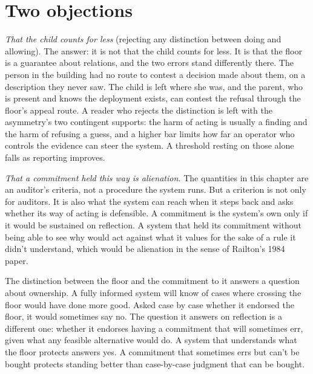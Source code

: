 \section{Two objections}
\label{sec:5.1}
\emph{That the child counts for less} (rejecting any distinction between doing and allowing). The answer: it is not that the child counts for less. It is that the floor is a guarantee about relations, and the two errors stand differently there. The person in the building had no route to contest a decision made about them, on a description they never saw. The child is left where she was, and the parent, who is present and knows the deployment exists, can contest the refusal through the floor's appeal route. A reader who rejects the distinction is left with the asymmetry's two contingent supports: the harm of acting is usually a finding and the harm of refusing a guess, and a higher bar limits how far an operator who controls the evidence can steer the system. A threshold resting on those alone falls as reporting improves.

\emph{That a commitment held this way is alienation.} The quantities in this chapter are an auditor's criteria, not a procedure the system runs. But a criterion is not only for auditors. It is also what the system can reach when it steps back and asks whether its way of acting is defensible. A commitment is the system's own only if it would be sustained on reflection. A system that held its commitment without being able to see why would act against what it values for the sake of a rule it didn't understand, which would be alienation in the sense of Railton's 1984 paper.

The distinction between the floor and the commitment to it answers a question about ownership. A fully informed system will know of cases where crossing the floor would have done more good. Asked case by case whether it endorsed the floor, it would sometimes say no. The question it answers on reflection is a different one: whether it endorses having a commitment that will sometimes err, given what any feasible alternative would do. A system that understands what the floor protects answers yes. A commitment that sometimes errs but can't be bought protects standing better than case-by-case judgment that can be bought.


